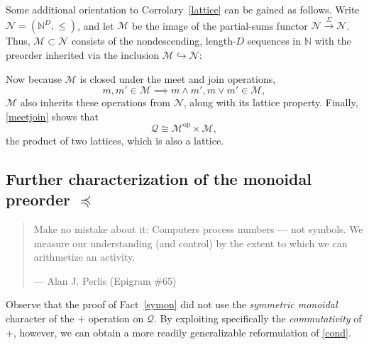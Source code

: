 \documentclass{article}
\newcommand{\N}{\mathbb{N}}
\newcommand{\Q}{\ensuremath{\mathcal{Q}}}
\newcommand{\M}{\ensuremath{\mathcal{M}}}
\DeclareMathOperator{\dual}{op}
\begin{document}
Some additional orientation to Corrolary~\ref{lattice} can be gained as follows.  Write $\mathcal{N} = (\N^D,\le)$, and let $\M$ be the image of the partial-sums functor $\mathcal{N} \xrightarrow{\Sigma} \mathcal{N}$.  Thus, $\M \subset \mathcal{N}$ consists of the nondescending, length-$D$ sequences in $\N$ with the preorder inherited via the inclusion $\M \hookrightarrow \mathcal{N}$:
\begin{center}
\end{center}
Now because $\M$ is closed under the meet and join operations,
$$
m, m' \in \M \implies m \wedge m', m \vee m' \in \M,
$$
$\M$ also inherits these operations from $\mathcal{N}$, along with its lattice property.  Finally, \eqref{meetjoin} shows that
$$
\Q \cong \M^{\dual} \times \M,
$$
the product of two lattices, which is also a lattice.

\subsection{Further characterization of the monoidal preorder $\preceq$}

\begin{quote}
  Make no mistake about it: Computers process numbers --- not symbols.
  We measure our understanding (and control) by the extent to which
  we can arithmetize an activity.
  
  \hfill --- Alan J. Perlis (Epigram \#65)
\end{quote}

Observe that the proof of Fact~\ref{symon} did not use the {\em symmetric monoidal} character of the $+$ operation on $\Q$.  By exploiting specifically the {\em commutativity} of $+$, however, we can obtain a more readily generalizable reformulation of \eqref{cond}.
\end{document}
